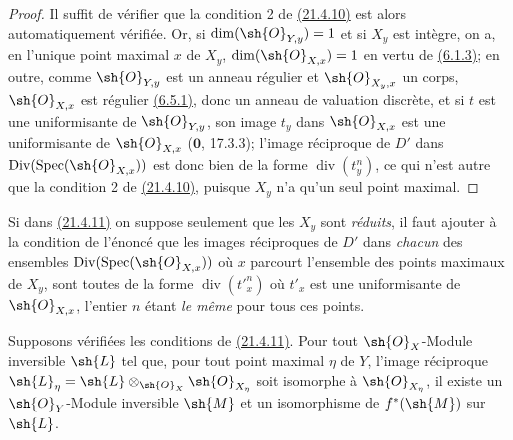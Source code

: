 \begin{proof}
Il suffit de vérifier que la condition 2\textdegree{} de
{\hyperlink{ega4.c04.cor.21-4-10}{(21.4.10)}} est alors
automatiquement vérifiée. Or, si $\dim(\sh{O}_{Y,y})=1$ et si $X_y$ est
intègre, on a, en l'unique point maximal $x$ de $X_y$,
$\dim(\sh{O}_{X,x})=1$ en vertu de
{\hyperref[canon-index.ega4.c04.cor.6-1-3]{(6.1.3)}}; en outre, comme
$\sh{O}_{Y,y}$ est un anneau régulier et $\sh{O}_{X_y,x}$ un corps,
$\sh{O}_{X,x}$ est régulier
{\hyperref[canon-index.ega4.c04.prop.6-5-1]{(6.5.1)}}, donc un anneau de valuation
discrète, et si $t$ est une uniformisante de $\sh{O}_{Y,y}$, son image
$t_y$ dans $\sh{O}_{X,x}$ est une uniformisante de $\sh{O}_{X,x}$
($\mathbf{0}$, 17.3.3); l'image réciproque de $D'$ dans
$\operatorname{Div}(\operatorname{Spec}(\sh{O}_{X,x}))$ est donc bien
de la forme
$\operatorname{div}(t_y^n)$, ce qui n'est autre que la condition
2\textdegree{} de {\hyperlink{ega4.c04.cor.21-4-10}{(21.4.10)}},
puisque $X_y$ n'a qu'un seul point maximal.
\end{proof}

\begin{remark}[21.4.12]
\label{IV.21.4.12}
Si dans {\hyperlink{ega4.c04.cor.21-4-11}{(21.4.11)}} on suppose
seulement que les $X_y$ sont \emph{réduits}, il faut ajouter à la condition de
l'énoncé que les images réciproques de $D'$ dans \emph{chacun} des ensembles
$\operatorname{Div}(\operatorname{Spec}(\sh{O}_{X,x}))$ où $x$
parcourt l'ensemble des points maximaux de $X_y$, sont toutes de la
forme $\operatorname{div}(t'^n_x)$ où $t'_x$ est une uniformisante
de $\sh{O}_{X,x}$, l'entier $n$ étant \emph{le même} pour tous ces points.
\end{remark}

\begin{corollary}[21.4.13]
\label{IV.21.4.13}
Supposons vérifiées les conditions de
\textup{\hyperlink{ega4.c04.cor.21-4-11}{(21.4.11)}}. Pour tout
$\sh{O}_X$-Module inversible $\sh{L}$ tel que, pour tout point maximal
$\eta$ de $Y$, l'image réciproque
$\sh{L}_\eta=\sh{L}\otimes_{\sh{O}_X}\sh{O}_{X_\eta}$
soit isomorphe à $\sh{O}_{X_\eta}$, il existe un
$\sh{O}_Y$-Module inversible $\sh{M}$ et un isomorphisme de
$f^*(\sh{M})$ sur $\sh{L}$.
\end{corollary}

